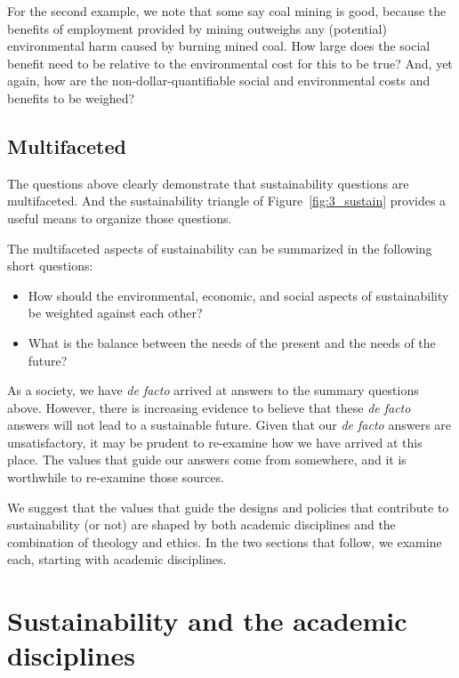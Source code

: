 \documentclass[12pt]{article}
\begin{document}
For the second example, we note that some say coal mining is good,
because the benefits of employment provided by mining outweighs
any (potential) environmental harm caused by burning mined coal. 
How large does the social benefit need to be relative to the environmental cost 
for this to be true?
And, yet again, how are the non-dollar-quantifiable 
social and environmental costs and benefits to be weighed? 


\subsection{Multifaceted}
\label{sec:multifaceted}

The questions above clearly demonstrate that sustainability questions are multifaceted.
And the sustainability triangle of Figure~\ref{fig:3_sustain} provides a useful means to organize those questions.

The multifaceted aspects of sustainability can be summarized in the following short questions:
%
\begin{itemize}

  \item How should the environmental, economic, and social aspects of sustainability be weighted against each other?
  
  \item What is the balance between the needs of the present and the needs of the future?	

\end{itemize}
%
As a society, we have \emph{de facto} arrived at answers to the summary questions above. 
However, there is increasing evidence to believe that these \emph{de facto}
answers will not lead to a sustainable future.
Given that our \emph{de facto} answers are unsatisfactory, 
it may be prudent to re-examine how we have arrived at this place.
The values that guide our answers come from somewhere, and 
it is worthwhile to re-examine those sources.

We suggest that the values that guide the designs and policies that contribute to sustainability (or not) 
are shaped by both academic disciplines and the combination of theology and ethics. 
In the two sections that follow, we examine each, 
starting with academic disciplines.


\section{Sustainability and the academic disciplines}
\label{sec:sustainability_and_the_academic_disciplines}
\end{document}

